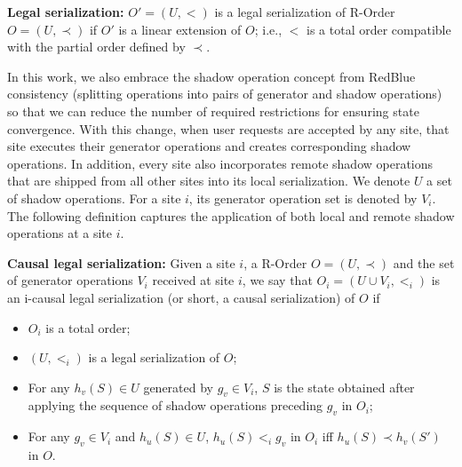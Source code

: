 \begin{mydef}
\textbf{Legal serialization: } $O' = (U, <)$ is a legal serialization of R-Order $O = (U, \prec)$
if $O'$ is a linear extension of $O$; i.e., $<$ is a total order compatible with the partial order defined by $\prec$.
\label{def:legalserial}
\end{mydef}

In this work, we also embrace
the shadow operation concept from RedBlue consistency (splitting operations into pairs of generator and shadow
operations) so that we can reduce the number of required restrictions for ensuring
state convergence. With this change,
when user requests are accepted by any site, that site executes their generator operations and 
creates corresponding shadow operations. In addition, every site also 
incorporates remote shadow operations that are shipped from all other sites into its local serialization. 
We denote $U$ a set of shadow operations. For a site $i$,
its generator operation set is denoted by $V_{i}$. The following definition captures the application
of both local and remote shadow operations at a site $i$.


\begin{mydef}
\textbf{Causal legal serialization: } Given a site $i$, a R-Order $O=(U, \prec)$ and the set of generator operations $V_i$ received at site $i$, we say that $O_i = (U\cup V_{i}, <_i)$ is an i-causal legal serialization (or short, a
causal serialization) of $O$ if
\begin{itemize}
\item $O_i$ is a total order;
\item $(U,<_i)$ is a legal serialization of $O$;
\item For any $h_v(S)\in U$ generated by $g_v\in V_i$, $S$ is the
  state obtained after applying the sequence of
  shadow operations preceding $g_v$ in $O_i$;
\item For any $g_v\in V_i$ and $h_u(S) \in U$, $h_u(S)<_{i}g_v$ in $O_i$
  iff $h_u(S) \prec h_v(S')$ in $O$.
\end{itemize}
\label{def:causalserial}
\end{mydef}


